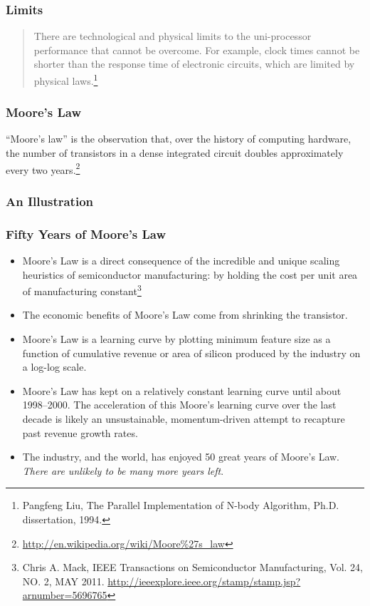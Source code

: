 \documentclass{beamer}
\begin{document}
\begin{CJK}{UTF8}{bsmi}
  \begin{frame}
    \frametitle{Limits}
    \begin{quote}There are technological and physical limits to the uni-processor performance that cannot be overcome. 
      For example, clock times cannot be shorter than the response time of electronic circuits, which are limited by physical laws.\footnote{Pangfeng Liu, The Parallel Implementation of N-body Algorithm, Ph.D. dissertation, 1994.}
    \end{quote}
  \end{frame}

  \begin{frame}
    \frametitle{Moore's Law}
    ``Moore's law'' is the observation that, over the history of computing
    hardware, the number of transistors in a dense integrated circuit
    doubles approximately every two
    years.\footnote{\url{http://en.wikipedia.org/wiki/Moore\%27s_law}}
  \end{frame}

  \begin{frame}
    \frametitle{An Illustration}
    \centerline{}
  \end{frame}

  \begin{frame}
    \frametitle{Fifty Years of Moore's Law}
    \begin{itemize}
    \item Moore's Law is a direct consequence of the incredible and unique
      scaling heuristics of semiconductor manufacturing: by holding the
      cost per unit area of manufacturing constant\footnote{Chris
        A. Mack, IEEE Transactions on Semiconductor Manufacturing,
        Vol. 24, NO. 2, MAY
        2011. \url{http://ieeexplore.ieee.org/stamp/stamp.jsp?arnumber=5696765}}
    \item The economic benefits of Moore's Law come from shrinking the transistor.
    \end{itemize}
  \end{frame}

  \begin{frame}
    \begin{itemize}
    \item Moore's Law is a learning curve by plotting minimum feature size as a function of cumulative revenue or area of silicon produced by the industry on a log-log scale.
    \item Moore's Law has kept on a relatively constant learning curve until about 1998–2000. The acceleration of this Moore's learning curve over the last decade is likely an unsustainable, momentum-driven attempt to recapture past revenue growth rates.
    \item The industry, and the world, has enjoyed 50 great years of Moore's Law. {\em There are unlikely to be many more years left}.
    \end{itemize}
  \end{frame}


\end{CJK}
\end{document}
